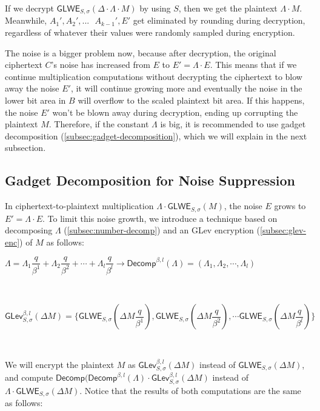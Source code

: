 If we decrypt $\textsf{GLWE}_{S, \sigma}(\Delta \cdot \Lambda \cdot M)$ by using $S$, then we get the plaintext $\Lambda \cdot M$. Meanwhile, $A_1', A_2', ... \text{ } A_{k-1}', E'$ get eliminated by rounding during decryption, regardless of whatever their values were randomly sampled during encryption. 

The noise is a bigger problem now, because after decryption, the original ciphertext $C$'s noise has increased from $E$ to $E' = \Lambda \cdot E$. This means that if we continue multiplication computations without decrypting the ciphertext to blow away the noise $E'$, it will continue growing more and eventually the noise in the lower bit area in $B$ will overflow to the scaled plaintext bit area. If this happens, the noise $E'$ won't be blown away during decryption, ending up corrupting the plaintext $M$. Therefore, if the constant $\Lambda$ is big, it is recommended to use gadget decomposition (\autoref{subsec:gadget-decomposition}), which we will explain in the next subsection. 

\subsection{Gadget Decomposition for Noise Suppression}
\label{subsubsec:gadget-decomposition-noise-suppression}

In ciphertext-to-plaintext multiplication $\Lambda \cdot \textsf{GLWE}_{S, \sigma}(M)$, the noise $E$ grows to $E' = \Lambda \cdot E$. To limit this noise growth, we introduce a technique based on decomposing $\Lambda$ (\autoref{subsec:number-decomp}) and an GLev encryption (\autoref{subsec:glev-enc}) of $M$ as follows:


$\Lambda = \Lambda_1 \dfrac{q}{\beta^1} + \Lambda_2 \dfrac{q}{\beta^2} + \cdots + \Lambda_l \dfrac{q}{\beta^l} \longrightarrow \textsf{Decomp}^{\beta, l}(\Lambda) = (\Lambda_1, \Lambda_2, \cdots, \Lambda_l)$

$ $

$\textsf{GLev}_{S, \sigma}^{\beta, l}(\Delta M) = \Bigg\{ \textsf{GLWE}_{S, \sigma}\left(\Delta M \dfrac{q}{\beta^1}\right), \textsf{GLWE}_{S, \sigma}\left(\Delta M \dfrac{q}{\beta^2}\right), \cdots \textsf{GLWE}_{S, \sigma}\left(\Delta M \dfrac{q}{\beta^l}\right) \Bigg\}$

$ $


We will encrypt the plaintext $M$ as $\textsf{GLev}_{S, \sigma}^{\beta, l}(\Delta M)$ instead of $\textsf{GLWE}_{S, \sigma}(\Delta M)$, and compute $\textsf{Decomp}(\textsf{Decomp}^{\beta, l}(\Lambda) \cdot \textsf{GLev}_{S, \sigma}^{\beta, l}(\Delta M)$ instead of $\Lambda \cdot \textsf{GLWE}_{S, \sigma}(\Delta M)$. Notice that the results of both computations are the same as follows:

